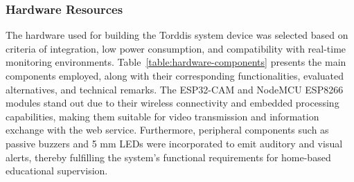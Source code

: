                 \subsubsection{Hardware Resources}
                The hardware used for building the Torddis system device was selected based on criteria of integration, low power consumption, and compatibility with real-time monitoring environments. Table~\ref{table:hardware-components} presents the main components employed, along with their corresponding functionalities, evaluated alternatives, and technical remarks. The ESP32-CAM and NodeMCU ESP8266 modules stand out due to their wireless connectivity and embedded processing capabilities, making them suitable for video transmission and information exchange with the web service. Furthermore, peripheral components such as passive buzzers and 5 mm LEDs were incorporated to emit auditory and visual alerts, thereby fulfilling the system’s functional requirements for home-based educational supervision.
                

